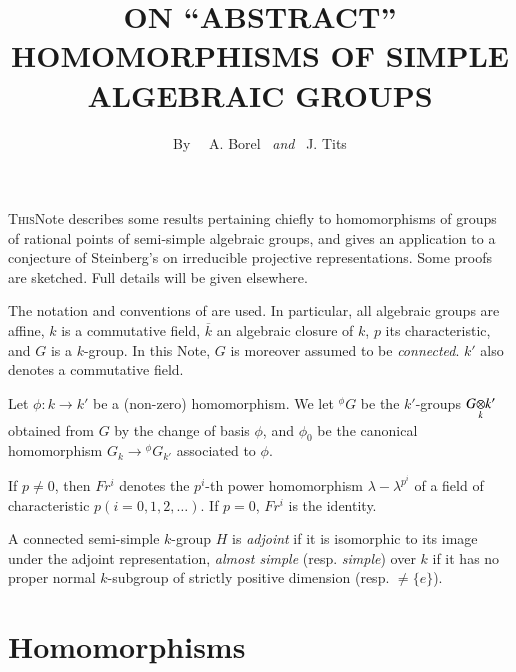 \title{ON ``ABSTRACT'' HOMOMORPHISMS OF SIMPLE ALGEBRAIC GROUPS}

\author{By~~ A. Borel ~{\em and}~ J. Tits}

\date{}

\maketitle

\setcounter{pageoriginal}{74}
\textsc{This}\pageoriginale Note describes some results pertaining chiefly to homomorphisms of groups of rational points of semi-simple algebraic groups, and gives an application to a conjecture of Steinberg's \cite{art05-key9} on irreducible projective representations. Some proofs are sketched. Full details will be given elsewhere.

\begin{notation*}
The notation and conventions of \cite{art05-key1} are used. In particular, all algebraic groups are affine, $k$ is a commutative field, $\overline{k}$ an algebraic closure of $k$, $p$ its characteristic, and $G$ is a $k$-group. In this Note, $G$ is moreover assumed to be {\em connected}. $k'$ also denotes a commutative field.
\end{notation*}

Let $\phi:k\to k'$ be a (non-zero) homomorphism. We let ${}^{\phi}G$ be the $k'$-groups $\foprod{G}{k'}{k}$ obtained from $G$ by the change of basis $\phi$, and $\phi_{0}$ be the canonical homomorphism $G_{k}\to {}^{\phi}G_{k'}$ associated to $\phi$.

If $p\neq 0$, then $Fr^{i}$ denotes the $p^{i}$-th power homomorphism $\lambda-\lambda^{p^{i}}$ of a field of characteristic $p(i=0,1,2,\ldots)$. If $p=0$, $Fr^{i}$ is the identity.

A connected semi-simple $k$-group $H$ is {\em adjoint} if it is isomorphic to its image under the adjoint representation, {\em almost simple} (resp. {\em simple}) over $k$ if it has no proper normal $k$-subgroup of strictly positive dimension (resp. $\neq \{e\}$).

\section{Homomorphisms}\label{art05-sec1}

